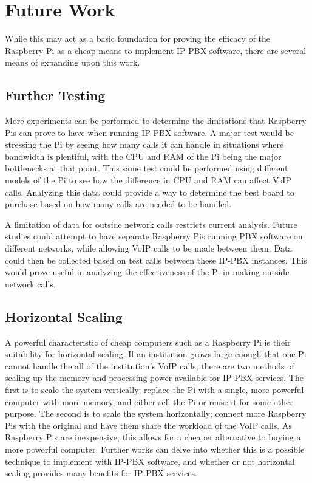 \section{Future Work} \label{sec:future-work}
    While this may act as a basic foundation for proving the efficacy of the Raspberry Pi as a cheap means to implement IP-PBX software, there are several means of expanding upon this work.
    \subsection{Further Testing}
        More experiments can be performed to determine the limitations that Raspberry Pis can prove to have when running IP-PBX software. A major test would be stressing the Pi by seeing how many calls it can handle in situations where bandwidth is plentiful, with the CPU and RAM of the Pi being the major bottlenecks at that point. This same test could be performed using different models of the Pi to see how the difference in CPU and RAM can affect VoIP calls. Analyzing this data could provide a way to determine the best board to purchase based on how many calls are needed to be handled.
        
        A limitation of data for outside network calls restricts current analysis. Future studies could attempt to have separate Raspberry Pis running PBX software on different networks, while allowing VoIP calls to be made between them. Data could then be collected based on test calls between these IP-PBX instances. This would prove useful in analyzing the effectiveness of the Pi in making outside network calls.
    \subsection{Horizontal Scaling}
        A powerful characteristic of cheap computers such as a Raspberry Pi is their suitability for horizontal scaling. If an institution grows large enough that one Pi cannot handle the all of the institution's VoIP calls, there are two methods of scaling up the memory and processing power available for IP-PBX services. The first is to scale the system vertically; replace the Pi with a single, more powerful computer with more memory, and either sell the Pi or reuse it for some other purpose. The second is to scale the system horizontally; connect more Raspberry Pis with the original and have them share the workload of the VoIP calls. As Raspberry Pis are inexpensive, this allows for a cheaper alternative to buying a more powerful computer. Further works can delve into whether this is a possible technique to implement with IP-PBX software, and whether or not horizontal scaling provides many benefits for IP-PBX services.